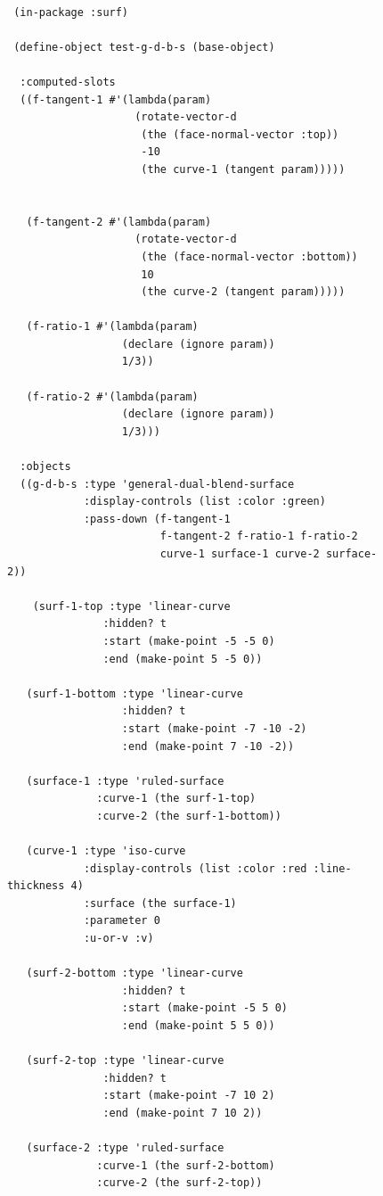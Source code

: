\documentclass [11pt]{book}
\begin{document}
\begin{itemize}
\begin{figure}
\begin{lrbox}{\boxedverb}
\begin{minipage}{\linewidth}
{\begin{verbatim}

 (in-package :surf)

 (define-object test-g-d-b-s (base-object)
  
  :computed-slots
  ((f-tangent-1 #'(lambda(param)
                    (rotate-vector-d 
                     (the (face-normal-vector :top))
                     -10
                     (the curve-1 (tangent param)))))
                    
   
   (f-tangent-2 #'(lambda(param)
                    (rotate-vector-d 
                     (the (face-normal-vector :bottom))
                     10
                     (the curve-2 (tangent param)))))
   
   (f-ratio-1 #'(lambda(param)
                  (declare (ignore param))
                  1/3))
   
   (f-ratio-2 #'(lambda(param)
                  (declare (ignore param))
                  1/3)))
   
  :objects
  ((g-d-b-s :type 'general-dual-blend-surface
            :display-controls (list :color :green)
            :pass-down (f-tangent-1 
                        f-tangent-2 f-ratio-1 f-ratio-2
                        curve-1 surface-1 curve-2 surface-2))
                                    
    (surf-1-top :type 'linear-curve
               :hidden? t
               :start (make-point -5 -5 0)
               :end (make-point 5 -5 0))
    
   (surf-1-bottom :type 'linear-curve
                  :hidden? t
                  :start (make-point -7 -10 -2)
                  :end (make-point 7 -10 -2))
    
   (surface-1 :type 'ruled-surface
              :curve-1 (the surf-1-top)
              :curve-2 (the surf-1-bottom))
    
   (curve-1 :type 'iso-curve
            :display-controls (list :color :red :line-thickness 4)
            :surface (the surface-1)
            :parameter 0
            :u-or-v :v)
    
   (surf-2-bottom :type 'linear-curve
                  :hidden? t
                  :start (make-point -5 5 0)
                  :end (make-point 5 5 0))
    
   (surf-2-top :type 'linear-curve
               :hidden? t
               :start (make-point -7 10 2)
               :end (make-point 7 10 2))
    
   (surface-2 :type 'ruled-surface
              :curve-1 (the surf-2-bottom)
              :curve-2 (the surf-2-top))
    

\end{verbatim}}
\end{minipage}
\end{lrbox}
\end{figure}
\end{itemize}
\end{document}
